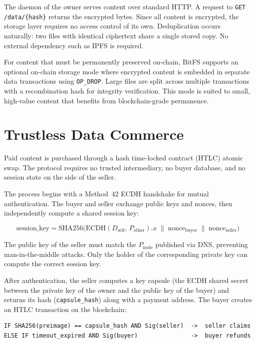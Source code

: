 \documentclass[11pt,a4paper]{article}
\begin{document}
The daemon of the owner serves content over standard HTTP. A request to \texttt{GET /data/\{hash\}} returns the encrypted bytes. Since all content is encrypted, the storage layer requires no access control of its own. Deduplication occurs naturally: two files with identical ciphertext share a single stored copy. No external dependency such as IPFS is required.

For content that must be permanently preserved on-chain, BitFS supports an optional on-chain storage mode where encrypted content is embedded in separate data transactions using \texttt{OP\_DROP}. Large files are split across multiple transactions with a recombination hash for integrity verification. This mode is suited to small, high-value content that benefits from blockchain-grade permanence.

\section{Trustless Data Commerce}
\label{sec:commerce}

Paid content is purchased through a hash time-locked contract (HTLC) atomic swap. The protocol requires no trusted intermediary, no buyer database, and no session state on the side of the seller.

The process begins with a Method~42 ECDH handshake for mutual authentication. The buyer and seller exchange public keys and nonces, then independently compute a shared session key:

\[
\text{session\_key} = \text{SHA256}\!\bigl(\text{ECDH}(D_{\text{self}},\, P_{\text{other}}).x \;\|\; \text{nonce}_{\text{buyer}} \;\|\; \text{nonce}_{\text{seller}}\bigr)
\]

The public key of the seller must match the $P_{\text{node}}$ published via DNS, preventing man-in-the-middle attacks. Only the holder of the corresponding private key can compute the correct session key.

After authentication, the seller computes a key capsule (the ECDH shared secret between the private key of the owner and the public key of the buyer) and returns its hash (\texttt{capsule\_hash}) along with a payment address. The buyer creates an HTLC transaction on the blockchain:

\begin{lstlisting}
IF SHA256(preimage) == capsule_hash AND Sig(seller)  ->  seller claims
ELSE IF timeout_expired AND Sig(buyer)               ->  buyer refunds
\end{lstlisting}
\end{document}
